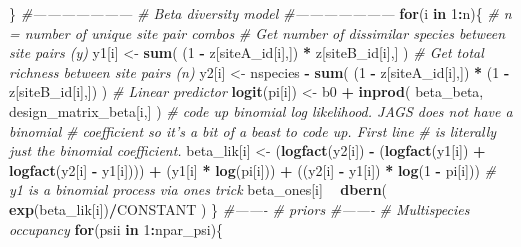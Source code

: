 \documentclass[
]{article}
\newenvironment{Shaded}{\begin{snugshade}}{\end{snugshade}}
\newcommand{\CommentTok}[1]{\textcolor[rgb]{0.56,0.35,0.01}{\textit{#1}}}
\newcommand{\ControlFlowTok}[1]{\textcolor[rgb]{0.13,0.29,0.53}{\textbf{#1}}}
\newcommand{\DecValTok}[1]{\textcolor[rgb]{0.00,0.00,0.81}{#1}}
\newcommand{\KeywordTok}[1]{\textcolor[rgb]{0.13,0.29,0.53}{\textbf{#1}}}
\newcommand{\NormalTok}[1]{#1}
\newcommand{\OperatorTok}[1]{\textcolor[rgb]{0.81,0.36,0.00}{\textbf{#1}}}
\newcommand{\StringTok}[1]{\textcolor[rgb]{0.31,0.60,0.02}{#1}}
\begin{document}
\begin{Shaded}
\begin{Highlighting}[]
\NormalTok{  \}}
  \CommentTok{#---------------------}
  \CommentTok{# Beta diversity model}
  \CommentTok{#---------------------}
  \ControlFlowTok{for}\NormalTok{(i }\ControlFlowTok{in} \DecValTok{1}\OperatorTok{:}\NormalTok{n)\{ }\CommentTok{# n = number of unique site pair combos}
    \CommentTok{# Get number of dissimilar species between site pairs (y)}
\NormalTok{    y1[i] <-}\StringTok{ }\KeywordTok{sum}\NormalTok{(}
\NormalTok{      (}\DecValTok{1} \OperatorTok{-}\StringTok{ }\NormalTok{z[siteA_id[i],]) }\OperatorTok{*}
\StringTok{        }\NormalTok{z[siteB_id[i],]}
\NormalTok{    )}
    \CommentTok{# Get total richness between site pairs (n)}
\NormalTok{    y2[i] <-}\StringTok{ }\NormalTok{nspecies }\OperatorTok{-}\StringTok{ }\KeywordTok{sum}\NormalTok{(}
\NormalTok{      (}\DecValTok{1} \OperatorTok{-}\StringTok{ }\NormalTok{z[siteA_id[i],]) }\OperatorTok{*}
\StringTok{        }\NormalTok{(}\DecValTok{1} \OperatorTok{-}\StringTok{ }\NormalTok{z[siteB_id[i],])}
\NormalTok{    )}
    \CommentTok{# Linear predictor}
    \KeywordTok{logit}\NormalTok{(pi[i]) <-}\StringTok{ }\NormalTok{b0 }\OperatorTok{+}\StringTok{ }\KeywordTok{inprod}\NormalTok{(}
\NormalTok{      beta_beta,}
\NormalTok{      design_matrix_beta[i,]}
\NormalTok{    )}
    \CommentTok{# code up binomial log likelihood. JAGS does not have a binomial}
    \CommentTok{# coefficient so it's a bit of a beast to code up. First line}
    \CommentTok{#  is literally just the binomial coefficient.}
\NormalTok{    beta_lik[i] <-}\StringTok{ }\NormalTok{(}\KeywordTok{logfact}\NormalTok{(y2[i]) }\OperatorTok{-}\StringTok{ }\NormalTok{(}\KeywordTok{logfact}\NormalTok{(y1[i]) }\OperatorTok{+}\StringTok{ }\KeywordTok{logfact}\NormalTok{(y2[i] }\OperatorTok{-}\StringTok{ }\NormalTok{y1[i]))) }\OperatorTok{+}\StringTok{ }
\StringTok{      }\NormalTok{(y1[i] }\OperatorTok{*}\StringTok{ }\KeywordTok{log}\NormalTok{(pi[i])) }\OperatorTok{+}\StringTok{ }\NormalTok{((y2[i] }\OperatorTok{-}\StringTok{ }\NormalTok{y1[i]) }\OperatorTok{*}\StringTok{ }\KeywordTok{log}\NormalTok{(}\DecValTok{1} \OperatorTok{-}\StringTok{ }\NormalTok{pi[i]))}
    \CommentTok{# y1 is a binomial process via ones trick}
\NormalTok{    beta_ones[i] }\OperatorTok{~}\StringTok{ }\KeywordTok{dbern}\NormalTok{( }
      \KeywordTok{exp}\NormalTok{(beta_lik[i])}\OperatorTok{/}\NormalTok{CONSTANT}
\NormalTok{    )}
\NormalTok{  \}}
  \CommentTok{#-------}
  \CommentTok{# priors}
  \CommentTok{#-------}
  \CommentTok{# Multispecies occupancy}
  \ControlFlowTok{for}\NormalTok{(psii }\ControlFlowTok{in} \DecValTok{1}\OperatorTok{:}\NormalTok{npar_psi)\{}

\end{Highlighting}
\end{Shaded}
\end{document}
